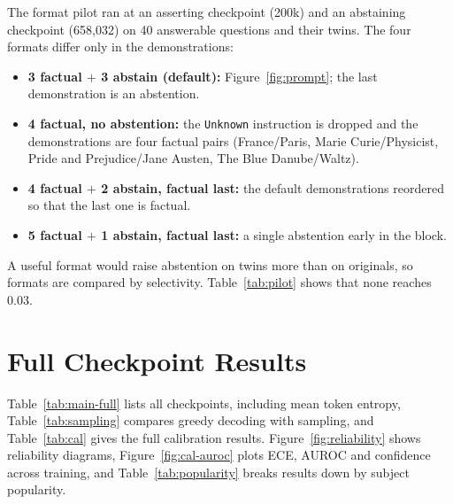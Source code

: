 \documentclass[11pt]{article}
\begin{document}
The format pilot ran at an asserting checkpoint (200k) and an abstaining checkpoint (658{,}032) on 40 answerable questions and their twins. The four formats differ only in the demonstrations:
\begin{itemize}
\item \textbf{3 factual $+$ 3 abstain (default):} Figure~\ref{fig:prompt}; the last demonstration is an abstention.
\item \textbf{4 factual, no abstention:} the \texttt{Unknown} instruction is dropped and the demonstrations are four factual pairs (France/Paris, Marie Curie/Physicist, Pride and Prejudice/Jane Austen, The Blue Danube/Waltz).
\item \textbf{4 factual $+$ 2 abstain, factual last:} the default demonstrations reordered so that the last one is factual.
\item \textbf{5 factual $+$ 1 abstain, factual last:} a single abstention early in the block.
\end{itemize}
A useful format would raise abstention on twins more than on originals, so formats are compared by selectivity. Table~\ref{tab:pilot} shows that none reaches $0.03$.

\begin{table}[t]
\centering
\small

\caption{Prompt-format pilot ($n=40$ per split). At step $658{,}032$ the default prompt yields blanket abstention and the factual-last prompts yield blanket assertion.}
\label{tab:pilot}
\end{table}

\section{Full Checkpoint Results}
\label{app:full}

Table~\ref{tab:main-full} lists all \resNumCheckpoints{} checkpoints, including mean token entropy, Table~\ref{tab:sampling} compares greedy decoding with sampling, and Table~\ref{tab:cal} gives the full calibration results. Figure~\ref{fig:reliability} shows reliability diagrams, Figure~\ref{fig:cal-auroc} plots ECE, AUROC and confidence across training, and Table~\ref{tab:popularity} breaks results down by subject popularity.

\begin{table}[h]
\centering
\resizebox{\columnwidth}{!}{%

}
\caption{Exact match and gold-answer NLL by subject popularity at the checkpoints of Table~\ref{tab:main}. Exact match is at floor in every stratum, so the popularity effect appears only in the likelihood.}
\label{tab:popularity}
\end{table}
\end{document}
